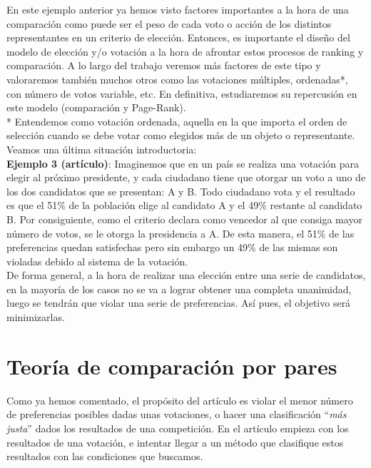\documentclass[a4paper]{article}
\begin{document}
	En este ejemplo anterior ya hemos visto factores importantes a la hora de una comparación como puede ser el peso de cada voto o acción de los distintos representantes en un criterio de elección. Entonces, es importante el diseño del modelo de elección y/o votación a la hora de afrontar estos procesos de ranking y comparación. A lo largo del trabajo veremos más factores de este tipo y valoraremos también muchos otros como las votaciones múltiples, ordenadas*, con número de votos variable, etc. En definitiva, estudiaremos su repercusión en este modelo (comparación y Page-Rank). \\
	

	* Entendemos como votación ordenada, aquella en la que importa el orden de selección cuando se debe votar como elegidos más de un objeto o representante.\\
	

	Veamos una última situación introductoria:\\
	

	\textbf{Ejemplo 3 (artículo)}:
	Imaginemos que en un país se realiza una votación para elegir al próximo presidente, y cada ciudadano tiene que otorgar un voto a uno de los dos candidatos que se presentan: A y B. Todo ciudadano vota y el resultado es que el 51$\%$ de la población elige al candidato A y el 49$\%$ restante al candidato B. Por consiguiente, como el criterio declara como vencedor al que consiga mayor número de votos, se le otorga la presidencia a A. De esta manera, el 51$\%$ de las preferencias quedan satisfechas pero sin embargo un 49$\%$ de las mismas son violadas debido al sistema de la votación.\\
	

	De forma general, a la hora de realizar una elección entre una serie de candidatos, en la mayoría de los casos no se va a lograr obtener una completa unanimidad, luego se tendrán que violar una serie de preferencias. Así pues, el objetivo será minimizarlas.\\
	
	
\section{Teoría de comparación por pares}
	Como ya hemos comentado, el propósito del artículo es violar el menor número de preferencias posibles dadas unas votaciones, o hacer una clasificación “\textit{más justa}” dados los resultados de una competición. En el artículo empieza con los resultados de una votación, e intentar llegar a un método que clasifique estos resultados con las condiciones que buscamos.\\
		
\end{document}
